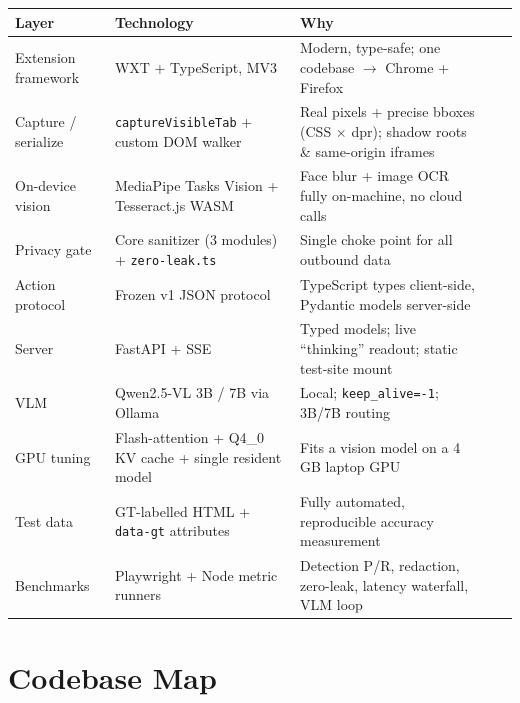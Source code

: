 \documentclass[11pt,a4paper]{article}
\newcommand{\code}[1]{\texttt{#1}}
\renewcommand{\arraystretch}{1.25}
\begin{document}
\begin{itemize}
\begin{table}[H]
\small
\renewcommand{\arraystretch}{1.3}
\begin{tabularx}{\linewidth}{@{}lXXXX@{}}
\toprule
\textbf{Layer} & \textbf{Technology} & \textbf{Why} \\
\midrule
Extension framework & WXT + TypeScript, MV3 & Modern, type-safe; one codebase $\rightarrow$ Chrome + Firefox \\
\midrule
Capture / serialize & \code{captureVisibleTab} + custom DOM walker & Real pixels + precise bboxes (CSS $\times$ dpr); shadow roots \& same-origin iframes \\
\midrule
On-device vision & MediaPipe Tasks Vision + Tesseract.js WASM & Face blur + image OCR fully on-machine, no cloud calls \\
\midrule
Privacy gate & Core sanitizer (3 modules) + \code{zero-leak.ts} & Single choke point for all outbound data \\
\midrule
Action protocol & Frozen v1 JSON protocol & TypeScript types client-side, Pydantic models server-side \\
\midrule
Server & FastAPI + SSE & Typed models; live ``thinking'' readout; static test-site mount \\
\midrule
VLM & Qwen2.5-VL 3B / 7B via Ollama & Local; \code{keep\_alive=-1}; 3B/7B routing \\
\midrule
GPU tuning & Flash-attention + Q4\_0 KV cache + single resident model & Fits a vision model on a 4 GB laptop GPU \\
\midrule
Test data & GT-labelled HTML + \code{data-gt} attributes & Fully automated, reproducible accuracy measurement \\
\midrule
Benchmarks & Playwright + Node metric runners & Detection P/R, redaction, zero-leak, latency waterfall, VLM loop \\
\bottomrule
\end{tabularx}
\end{table}

\section{Codebase Map}


\end{itemize}
\end{document}

